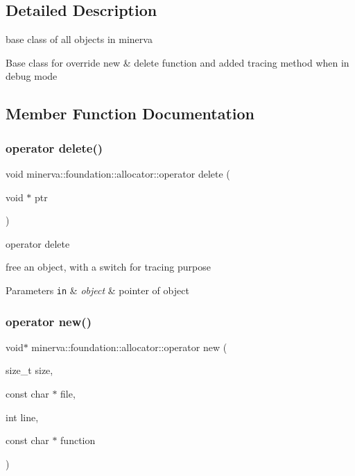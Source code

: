 \subsection{Detailed Description}
base class of all objects in minerva 

Base class for override new \& delete function and added tracing method when in debug mode 

\subsection{Member Function Documentation}
\mbox{\label{classminerva_1_1foundation_1_1allocator_ae33b6c28ecbd236c7e974ac9270601a8}} 
\subsubsection{\texorpdfstring{operator delete()}{operator delete()}}
{\footnotesize\ttfamily void minerva\+::foundation\+::allocator\+::operator delete (\begin{DoxyParamCaption}\item[{void $\ast$}]{ptr }\end{DoxyParamCaption})\hspace{0.3cm}{\ttfamily [inline]}}



operator delete 

free an object, with a switch for tracing purpose


\begin{DoxyParams}[1]{Parameters}
\mbox{\tt in}  & {\em object} & pointer of object \\
\hline
\end{DoxyParams}
\mbox{\label{classminerva_1_1foundation_1_1allocator_af693b0cd3bdec3bfdc4885b15f9d04c6}} 
\subsubsection{\texorpdfstring{operator new()}{operator new()}}
{\footnotesize\ttfamily void$\ast$ minerva\+::foundation\+::allocator\+::operator new (\begin{DoxyParamCaption}\item[{size\+\_\+t}]{size,  }\item[{const char $\ast$}]{file,  }\item[{int}]{line,  }\item[{const char $\ast$}]{function }\end{DoxyParamCaption})\hspace{0.3cm}{\ttfamily [inline]}}



